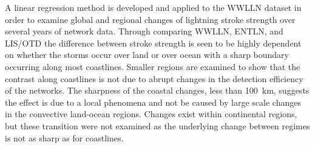 A linear regression method is developed and applied to the WWLLN dataset in order to examine global and regional changes of lightning stroke strength over several years of network data.
Through comparing WWLLN, ENTLN, and LIS/OTD the difference between stroke strength is seen to be highly dependent on whether the storms occur over land or over ocean with a sharp boundary occurring along most coastlines.
Smaller regions are examined to show that the contrast along coastlines is not due to abrupt changes in the detection efficiency of the networks.
The sharpness of the coastal changes, less than 100~km, suggests the effect is due to a local phenomena and not be caused by large scale changes in the convective land-ocean regions.
Changes exist within continental regions, but these transition were not examined as the underlying change between regimes is not as sharp as for coastlines.


